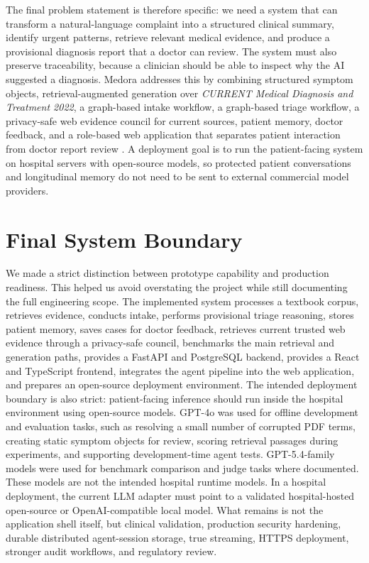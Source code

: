 The final problem statement is therefore specific: we need a system that can transform a natural-language complaint into a structured clinical summary, identify urgent patterns, retrieve relevant medical evidence, and produce a provisional diagnosis report that a doctor can review. The system must also preserve traceability, because a clinician should be able to inspect why the AI suggested a diagnosis. Medora addresses this by combining structured symptom objects, retrieval-augmented generation over \textit{CURRENT Medical Diagnosis and Treatment 2022}, a graph-based intake workflow, a graph-based triage workflow, a privacy-safe web evidence council for current sources, patient memory, doctor feedback, and a role-based web application that separates patient interaction from doctor report review \cite{cmdt2022,lewis2020rag}. A deployment goal is to run the patient-facing system on hospital servers with open-source models, so protected patient conversations and longitudinal memory do not need to be sent to external commercial model providers.

\section{Final System Boundary}

We made a strict distinction between prototype capability and production readiness. This helped us avoid overstating the project while still documenting the full engineering scope. The implemented system processes a textbook corpus, retrieves evidence, conducts intake, performs provisional triage reasoning, stores patient memory, saves cases for doctor feedback, retrieves current trusted web evidence through a privacy-safe council, benchmarks the main retrieval and generation paths, provides a FastAPI and PostgreSQL backend, provides a React and TypeScript frontend, integrates the agent pipeline into the web application, and prepares an open-source deployment environment. The intended deployment boundary is also strict: patient-facing inference should run inside the hospital environment using open-source models. GPT-4o was used for offline development and evaluation tasks, such as resolving a small number of corrupted PDF terms, creating static symptom objects for review, scoring retrieval passages during experiments, and supporting development-time agent tests. GPT-5.4-family models were used for benchmark comparison and judge tasks where documented. These models are not the intended hospital runtime models. In a hospital deployment, the current LLM adapter must point to a validated hospital-hosted open-source or OpenAI-compatible local model. What remains is not the application shell itself, but clinical validation, production security hardening, durable distributed agent-session storage, true streaming, HTTPS deployment, stronger audit workflows, and regulatory review.

